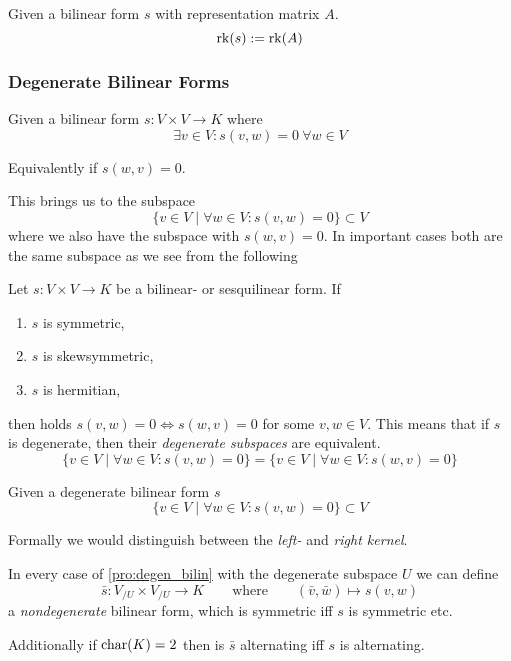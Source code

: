 \begin{definition}
   Given a bilinear form \(s\) with representation matrix \(A\).
   \[\operatorname{rk}(s) := \operatorname{rk}(A)\]
\end{definition}

\subsubsection{Degenerate Bilinear Forms}
\begin{definition}
   Given a bilinear form \(s: V\times V \to K\) where
   \[\exists v \in V: s(v, w) = 0~\forall w \in V\]
\end{definition}
\begin{remark}
   Equivalently if \(s(w, v) = 0\).
\end{remark}
This brings us to the subspace
\[\{v \in V \mid \forall w \in V: s(v, w) = 0\} \subset V\]
where we also have the subspace with \(s(w, v) = 0\).
In important cases both are the same subspace as we see from the following
\begin{proposition}\label{pro:degen_bilin}
   Let \(s: V \times V \to K\) be a bilinear- or sesquilinear form.
   If
   \begin{enumerate}[label=\roman*, align=Center]
      \item \(s\) is symmetric,
      \item \(s\) is skewsymmetric,
      \item \(s\) is hermitian,
   \end{enumerate}
   then holds \(s(v, w) = 0 \iff s(w, v) = 0\) for some \(v, w \in V\).
   This means that if \(s\) is degenerate, then their \emph{degenerate subspaces} are equivalent.
   \[\{v \in V \mid \forall w \in V: s(v, w) = 0\} = \{v \in V \mid \forall w \in V: s(w, v) = 0\}\]
\end{proposition}

\begin{definition}
   Given a degenerate bilinear form \(s\)
   \[\{v \in V \mid \forall w \in V: s(v, w) = 0\} \subset V\]
\end{definition}
\begin{remark}
   Formally we would distinguish between the \emph{left-} and \emph{right kernel}.
\end{remark}

\begin{proposition}
   In every case of \cref{pro:degen_bilin} with the degenerate subspace \(U\) we can define
   \[\bar{s}: V_{/U}\times V_{/U} \to K \qquad\text{where}\qquad (\bar{v}, \bar{w}) \mapsto s(v, w)\]
   a \emph{nondegenerate} bilinear form, which is symmetric iff \(s\) is symmetric etc.

   Additionally if \(\operatorname{char}(K) = 2\) then is \(\bar{s}\) alternating iff \(s\) is alternating.
\end{proposition}

